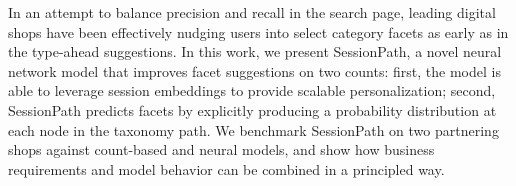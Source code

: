 In an attempt to balance precision and recall in the search page, leading digital shops have been effectively nudging users into select category facets as early as in the type-ahead suggestions. In this work, we present SessionPath, a novel neural network model that improves facet suggestions on two counts: first, the model is able to leverage session embeddings to provide scalable personalization; second, SessionPath predicts facets by explicitly producing a probability distribution at each node in the taxonomy path. We benchmark SessionPath on two partnering shops against count-based and neural models, and show how business requirements and model behavior can be combined in a principled way.
